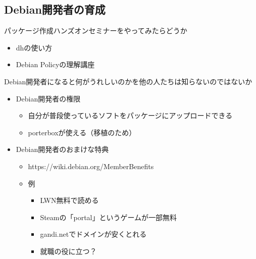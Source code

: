 \documentclass[mingoth,a4paper]{jsarticle}
\begin{document}
\subsection{Debian開発者の育成}
パッケージ作成ハンズオンセミナーをやってみたらどうか
\begin{itemize}
\item dhの使い方
\item Debian Policyの理解講座
\end{itemize}
Debian開発者になると何がうれしいのかを他の人たちは知らないのではないか
\begin{itemize}
\item Debian開発者の権限
  \begin{itemize}
  \item 自分が普段使っているソフトをパッケージにアップロードできる
  \item  porterboxが使える（移植のため）
  \end{itemize}
\item Debian開発者のおまけな特典
  \begin{itemize}
  \item https://wiki.debian.org/MemberBenefits
  \item 例
    \begin{itemize}
      \item LWN無料で読める
      \item Steamの「portal」というゲームが一部無料
      \item gandi.netでドメインが安くとれる
      \item 就職の役に立つ？
    \end{itemize}
  \end{itemize}
\end{itemize}
\end{document}
